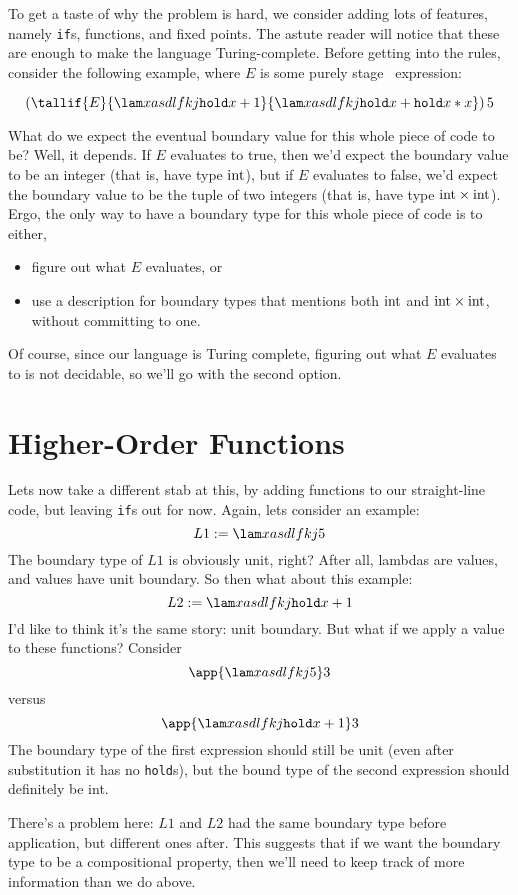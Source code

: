 \documentclass[]{article}
\newcommand {\next}{asdlfkj}
\begin{document}
\begin{abstrsyn}
To get a taste of why the problem is hard,
we consider adding lots of features, namely \texttt{if}s, functions, and fixed points.
The astute reader will notice that these are enough to make the language Turing-complete.
Before getting into the rules, consider the following example, 
where $E$ is some purely stage \bbone\ expression:

\[
\left(
\tallif {E}
	{\lam x {\next{\pause{x}+1}}}
	{\lam x {\next{\pause{x}+\pause{x*x}}}}
\right ) 5
\]

What do we expect the eventual boundary value for this whole piece of code to be?
Well, it depends. 
If $E$ evaluates to true, then we'd expect the boundary value to be an integer (that is, have type ${\rm int}$),
but if $E$ evaluates to false, we'd expect the boundary value to be the tuple of two integers (that is, have type ${\rm int} \times {\rm int}$).
Ergo, the only way to have a boundary type for this whole piece of code is to either,
\begin{itemize}
\item figure out what $E$ evaluates, or
\item use a description for boundary types that mentions both ${\rm int}$ and ${\rm int} \times {\rm int}$, 
without committing to one.
\end{itemize}

Of course, since our language is Turing complete, figuring out what $E$ evaluates to is not decidable,
so we'll go with the second option.

\section{Higher-Order Functions}
\label{sec:higherorder}

Lets now take a different stab at this, by adding functions to our straight-line code,
but leaving \texttt{if}s out for now.
Again, lets consider an example:
\[
L1 := \lam x {\next{5}}
\]
The boundary type of $L1$ is obviously unit, right?
After all, lambdas are values, and values have unit boundary.
So then what about this example:
\[
L2 := \lam x {\next{\pause{x}+1}}
\]
I'd like to think it's the same story: unit boundary.
But what if we apply a value to these functions?
Consider
\[
\app {\lam x {\next{5}}} 3
\]
versus
\[
\app {\lam x {\next{\pause{x}+1}}} 3
\]
The boundary type of the first expression should still be unit 
(even after substitution it has no {\tt hold}s),
but the bound type of the second expression should definitely be int.

There's a problem here: $L1$ and $L2$ had the same boundary type before application, but different ones after.
This suggests that if we want the boundary type to be a compositional property,
then we'll need to keep track of more information than we do above.


\end{abstrsyn}
\end{document}
